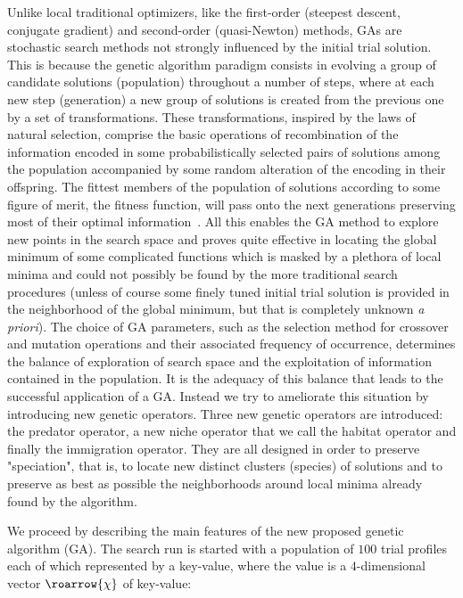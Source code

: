 \documentclass[superbib,unsortedaddress,preprint,byrevtex,aps,noshowpacs,titlepage]{revtex4}
\def\mytodo#1{$\clubsuit$\todo[noline]{$\clubsuit$\,\,\footnotesize #1}}
\def\vchi{\roarrow{\chi}}
\begin{document}
Unlike local traditional optimizers, like the first-order (steepest descent, conjugate gradient) and 
second-order (quasi-Newton) methods, GAs are stochastic search methods not strongly influenced by the 
initial trial solution. 
This is because the genetic algorithm paradigm consists in evolving a group of candidate solutions 
(population) throughout a number of steps, where at each new step (generation) a new group of solutions is created
 from the previous one by a set of transformations. 
These transformations, inspired by the laws of natural selection, comprise the basic
 operations of recombination of the information encoded in some probabilistically selected pairs of solutions among
the population accompanied by some random alteration of the encoding in their offspring. 
The fittest members of the population of solutions according to some figure of merit, the fitness function, will pass 
onto the next generations preserving most of their optimal information~\cite{Goldberg1989}.
All this enables the GA method to explore new points in the search space and proves quite effective in locating
the global minimum of some complicated functions which is masked by a plethora of local minima %
and could not possibly be found by the more traditional search procedures (unless of course some finely 
tuned initial trial solution is provided in the neighborhood of the global minimum, but that is 
completely unknown {\it a priori}).
The choice of GA parameters, such as the selection method for crossover and mutation operations and their 
associated frequency of occurrence, determines the balance of exploration of search space and the exploitation of
information contained in the population. 
It is the adequacy of this balance that leads to the successful application of a GA.
Instead we try to ameliorate this situation by introducing new genetic operators.
Three new genetic operators are introduced: the predator operator, a new niche %
operator that we call the habitat operator and finally the immigration operator.
They are all designed in order to preserve "speciation", that is, to locate new distinct clusters (species) of
solutions and to preserve as best as possible the neighborhoods around local minima already found 
by the algorithm.

We proceed by describing the main features of the new proposed genetic algorithm (GA).
The search run is started with a population of $100$ trial profiles each of which represented by
a key-value, where the value is a $4$-dimensional vector $\vchi$ of key-value: 
\end{document}
